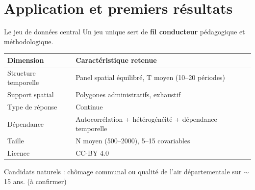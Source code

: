 \documentclass[aspectratio=169,11pt]{beamer}
\begin{document}
\section{Application et premiers résultats}
\begin{frame}{Le jeu de données central}
\small
Un jeu unique sert de \textbf{fil conducteur} pédagogique et méthodologique.
\vspace{0.25cm}
\begin{tabularx}{\textwidth}{>{\RaggedRight\arraybackslash}p{} >{\RaggedRight\arraybackslash}X}
\toprule
\textbf{Dimension} & \textbf{Caractéristique retenue} \\
\midrule
Structure temporelle & Panel spatial équilibré, T moyen (10--20 périodes) \\
Support spatial & Polygones administratifs, exhaustif \\
Type de réponse & Continue \\
Dépendance & Autocorrélation + hétérogénéité + dépendance temporelle \\
Taille & N moyen (500--2000), 5--15 covariables \\
Licence & CC-BY 4.0 \\
\bottomrule
\end{tabularx}
\vspace{0.2cm}
\footnotesize Candidats naturels : chômage communal ou qualité de l'air départementale sur $\sim$15 ans. \textcolor{mygray}{(à confirmer)}
\end{frame}
\end{document}
